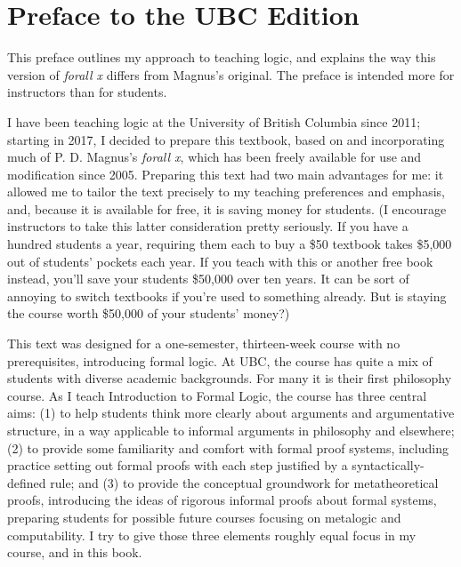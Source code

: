 \chapter*{Preface to the UBC Edition}
\label{ch.preface}


This preface outlines my approach to teaching logic, and explains the way this version of \emph{forall x} differs from Magnus's original. The preface is intended more for instructors than for students. 

I have been teaching logic at the University of British Columbia since 2011; starting in 2017, I decided to prepare this textbook, based on and incorporating much of P. D. Magnus's \emph{forall x}, which has been freely available for use and modification since 2005. Preparing this text had two main advantages for me: it allowed me to tailor the text precisely to my teaching preferences and emphasis, and, because it is available for free, it is saving money for students. (I encourage instructors to take this latter consideration pretty seriously. If you have a hundred students a year, requiring them each to buy a \$50 textbook takes \$5,000 out of students' pockets each year. If you teach with this or another free book instead, you'll save your students \$50,000 over ten years. It can be sort of annoying to switch textbooks if you're used to something already. But is staying the course worth \$50,000 of your students' money?)

This text was designed for a one-semester, thirteen-week course with no prerequisites, introducing formal logic. At UBC, the course has quite a mix of students with diverse academic backgrounds. For many it is their first philosophy course. As I teach Introduction to Formal Logic, the course has three central aims: (1) to help students think more clearly about arguments and argumentative structure, in a way applicable to informal arguments in philosophy and elsewhere; (2) to provide some familiarity and comfort with formal proof systems, including practice setting out formal proofs with each step justified by a syntactically-defined rule; and (3) to provide the conceptual groundwork for metatheoretical proofs, introducing the ideas of rigorous informal proofs about formal systems, preparing students for possible future courses focusing on metalogic and computability. I try to give those three elements roughly equal focus in my course, and in this book.

